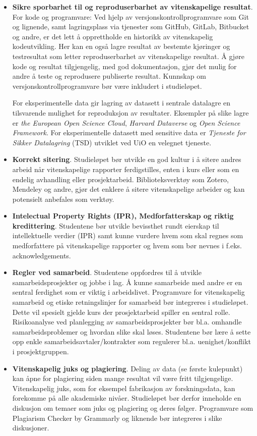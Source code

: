 \documentclass{article}
\begin{document}
\begin{itemize}
  \item \textbf{Sikre sporbarhet til og reproduserbarhet av vitenskapelige resultat}. For kode og programvare: Ved hjelp av versjonskontrollprogramvare som Git og lignende, samt lagringsplass via tjenester som GitHub, GitLab, Bitbucket og andre, er det lett å opprettholde en historikk av vitenskapelig kodeutvikling. Her kan en også lagre resultat av bestemte kjøringer og testresultat som letter reproduserbarhet av vitenskapelige resultat. Å gjøre kode og resultat tilgjengelig, med god dokumentasjon, gjør det mulig for andre å teste og reprodusere publiserte resultat. Kunnskap om versjonskontrollprogramvare bør være inkludert i studieløpet.

    For eksperimentelle data gir lagring av datasett i sentrale datalagre en tilsvarende mulighet for reproduksjon av resultater. Eksempler på slike lagre er \emph{the European Open Science Cloud}, \emph{Harvard Dataverse} og \emph{Open Science Framework}. For eksperimentelle datasett med sensitive data er \emph{Tjeneste for Sikker Datalagring} (TSD) utviklet ved UiO en velegnet tjeneste.
  \item \textbf{Korrekt sitering}. Studieløpet bør utvikle en god kultur i å sitere andres arbeid når vitenskapelige rapporter ferdigstilles, enten i kurs eller som en endelig avhandling eller prosjektarbeid. Biblioteksverktøy som Zotero, Mendeley og andre, gjør det enklere å sitere vitenskapelige arbeider og kan potensielt anbefales som verktøy.
  \item \textbf{Intelectual Property Rights (IPR), Medforfatterskap og riktig kredittering}. Studentene bør utvikle bevissthet rundt eierskap til intellektuelle verdier (IPR) samt kunne vurdere hvem som skal regnes som medforfattere på vitenskapelige rapporter og hvem som bør nevnes i f.eks. acknowledgements.
  \item \textbf{Regler ved samarbeid}. Studentene oppfordres til å utvikle samarbeidsprosjekter og jobbe i lag. Å kunne samarbeide med andre er en sentral ferdighet som er viktig i arbeidslivet. Programvare for vitenskapelig samarbeid og etiske retningslinjer for samarbeid bør integreres i studieløpet. Dette vil spesielt gjelde kurs der prosjektarbeid spiller en sentral rolle.
  Risikoanalyse ved planlegging av samarbeidsprosjekter bør bl.a. omhandle samarbeidsproblemer og hvordan slike skal løses. Studentene bør lære å sette opp enkle samarbeidsavtaler/kontrakter som regulerer bl.a. uenighet/konflikt i prosjektgruppen.
  \item \textbf{Vitenskapelig juks og plagiering}. Deling av data (se første kulepunkt) kan åpne for plagiering siden mange resultat vil være fritt tilgjengelige. Vitenskapelig juks, som for eksempel fabrikasjon av forskningsdata, kan forekomme på alle akademiske nivåer. Studieløpet bør derfor inneholde en diskusjon om temaer som juks og plagiering og deres følger. Programvare som Plagiarism Checker by Grammarly og liknende bør integreres i slike diskusjoner.
\end{itemize}
\end{document}

